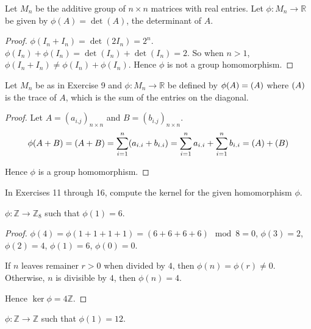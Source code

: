 \newpage
\begin{exercise}
    Let $M_{n}$ be the additive group of $n\times n$ matrices with real entries. Let $\phi: M_{n}\to \mathbb{R}$ be given by $\phi(A) = \det(A)$, the determinant of $A$.
\end{exercise}

\begin{proof}
    $\phi(I_{n} + I_{n}) = \det(2I_{n}) = 2^{n}$. $\phi(I_{n}) + \phi(I_{n}) = \det(I_{n}) + \det(I_{n}) = 2$. So when $n > 1$, $\phi(I_{n} + I_{n}) \ne \phi(I_{n}) + \phi(I_{n})$. Hence $\phi$ is not a group homomorphism.
\end{proof}

\newpage
\begin{exercise}
    Let $M_{n}$ be as in Exercise 9 and $\phi: M_{n} \to \mathbb{R}$ be defined by $\phi(A) = \left({A}\right)$ where $\left({A}\right)$ is the trace of $A$, which is the sum of the entries on the diagonal.
\end{exercise}

\begin{proof}
    Let $A = {(a_{i.j})}_{n\times n}$ and $B = {(b_{i.j})}_{n\times n}$.
    \[
        \phi(A + B) = \left({A + B}\right) = \sum^{n}_{i=1}(a_{i.i} + b_{i.i}) = \sum^{n}_{i=1}a_{i.i} + \sum^{n}_{i=1}b_{i.i} = \left({A}\right) + \left({B}\right)
    \]

    Hence $\phi$ is a group homomorphism.
\end{proof}

In Exercises 11 through 16, compute the kernel for the given homomorphism $\phi$.

\newpage
\begin{exercise}
    $\phi: \mathbb{Z} \to \mathbb{Z}_{8}$ such that $\phi(1) = 6$.
\end{exercise}

\begin{proof}
    $\phi(4) = \phi(1 + 1 + 1 + 1) = (6 + 6 + 6 + 6)\mod 8 = 0$, $\phi(3) = 2$, $\phi(2) = 4$, $\phi(1) = 6$, $\phi(0) = 0$.

    If $n$ leaves remainer $r > 0$ when divided by $4$, then $\phi(n) = \phi(r) \ne 0$. Otherwise, $n$ is divisible by $4$, then $\phi(n) = 4$.

    Hence $\ker\phi = 4\mathbb{Z}$.
\end{proof}

\newpage
\begin{exercise}
    $\phi: \mathbb{Z} \to \mathbb{Z}$ such that $\phi(1) = 12$.
\end{exercise}

